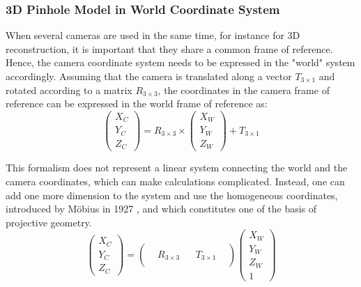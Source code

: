 \subsubsection{3D Pinhole Model in World Coordinate System}

When several cameras are used in the same time, for instance for 3D reconstruction, it is important that they share a common frame of reference. Hence, the camera coordinate system needs to be expressed in the "world" system accordingly. Assuming that the camera is translated along a vector $T_{3\times 1}$ and rotated according to a matrix $R_{3\times 3}$, the coordinates in the camera frame of reference can be expressed in the world frame of reference as:
\begin{equation}
  \begin{pmatrix}X_C\\Y_C\\Z_C\end{pmatrix}
  = R_{3\times 3} \times \begin{pmatrix}X_W\\Y_W\\Z_W\end{pmatrix} + T_{3\times 1}
\end{equation}

\newpage
This formalism does not represent a linear system connecting the world and the camera coordinates, which can make calculations complicated. Instead, one can add one more dimension to the system and use the homogeneous coordinates, introduced by Möbius in 1927 \cite{Mobius1827}, and which constitutes one of the basis of projective geometry.
\begin{equation}\label{homogeneous}
  \begin{pmatrix}X_C\\Y_C\\Z_C\end{pmatrix}
  = \begin{pmatrix} &  & & \\ & R_{3\times 3} &  & T_{3\times 1} \\ &&&&\end{pmatrix} \begin{pmatrix}X_W\\Y_W\\Z_W\\1\end{pmatrix}
\end{equation}

